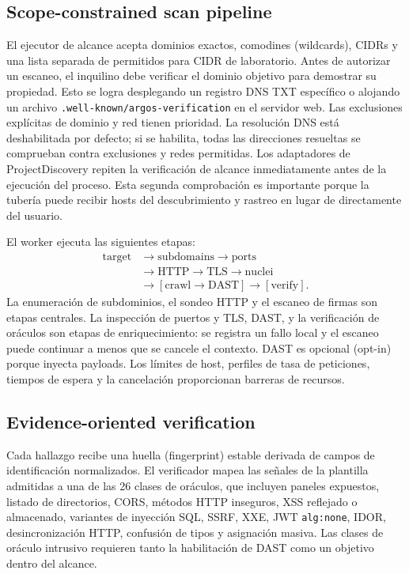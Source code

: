 \documentclass[conference,a4paper]{IEEEtran}
\newcommand{\code}[1]{\texttt{#1}}
\begin{document}
\subsection{Scope-constrained scan pipeline}

El ejecutor de alcance acepta dominios exactos, comodines (wildcards), CIDRs y una lista separada de permitidos para CIDR de laboratorio. Antes de autorizar un escaneo, el inquilino debe verificar el dominio objetivo para demostrar su propiedad. Esto se logra desplegando un registro DNS TXT específico o alojando un archivo \code{.well-known/argos-verification} en el servidor web. Las exclusiones explícitas de dominio y red tienen prioridad. La resolución DNS está deshabilitada por defecto; si se habilita, todas las direcciones resueltas se comprueban contra exclusiones y redes permitidas. Los adaptadores de ProjectDiscovery repiten la verificación de alcance inmediatamente antes de la ejecución del proceso. Esta segunda comprobación es importante porque la tubería puede recibir hosts del descubrimiento y rastreo en lugar de directamente del usuario.

El worker ejecuta las siguientes etapas:
\begin{equation}
\begin{split}
\mathrm{target} &\rightarrow \mathrm{subdomains} \rightarrow \mathrm{ports} \\
&\rightarrow \mathrm{HTTP} \rightarrow \mathrm{TLS} \rightarrow \mathrm{nuclei} \\
&\rightarrow [\mathrm{crawl} \rightarrow \mathrm{DAST}] \rightarrow [\mathrm{verify}].
\end{split}
\label{eq:pipeline}
\end{equation}
La enumeración de subdominios, el sondeo HTTP y el escaneo de firmas son etapas centrales. La inspección de puertos y TLS, DAST, y la verificación de oráculos son etapas de enriquecimiento: se registra un fallo local y el escaneo puede continuar a menos que se cancele el contexto. DAST es opcional (opt-in) porque inyecta payloads. Los límites de host, perfiles de tasa de peticiones, tiempos de espera y la cancelación proporcionan barreras de recursos.

\subsection{Evidence-oriented verification}

Cada hallazgo recibe una huella (fingerprint) estable derivada de campos de identificación normalizados. El verificador mapea las señales de la plantilla admitidas a una de las 26 clases de oráculos, que incluyen paneles expuestos, listado de directorios, CORS, métodos HTTP inseguros, XSS reflejado o almacenado, variantes de inyección SQL, SSRF, XXE, JWT \code{alg:none}, IDOR, desincronización HTTP, confusión de tipos y asignación masiva. Las clases de oráculo intrusivo requieren tanto la habilitación de DAST como un objetivo dentro del alcance.
\end{document}
